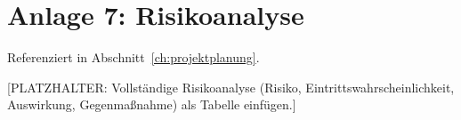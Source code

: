 \section*{Anlage 7: Risikoanalyse}
\label{anh:risikoanalyse}
Referenziert in Abschnitt~\ref{ch:projektplanung}.

[PLATZHALTER: Vollst\"andige Risikoanalyse (Risiko, Eintrittswahrscheinlichkeit,
Auswirkung, Gegenma\ss{}nahme) als Tabelle einf\"ugen.]

